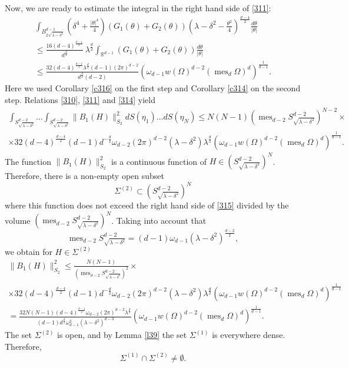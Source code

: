 \documentclass[a4paper,12pt]{article}
\numberwithin{equation}{section}
\def \de{\delta}
\def \la{\lambda}
\def \te{\theta}
\def \oo{\omega}
\def \O{\Omega}
\def \R{\mathbb{R}}
\def\mes{\operatorname{mes}}
\newcommand{\<}{\langle}
\renewcommand{\>}{\rangle}
\theoremstyle{plain}
\theoremstyle{definition}
\theoremstyle{remark}
\renewcommand{\le}{\leqslant}
\begin{document}
Now, we are ready to estimate the integral in the right hand side of \eqref{311}:
\begin{eqnarray}
\nonumber
\int_{B_{2\sqrt{\la-\de^2}}^{d-1}} \left(\de^4 + \frac{|\te|^4}4\right)
\left(G_1(\te) + G_2(\te)\right) \left(\la - \de^2 - \frac{\te^2}4\right)^{\frac{d-4}2} \frac{d\te}{|\te|} \\
\label{314}
\le \frac{16 (d-4)^{\frac{d-4}2}}{d^{\frac{d}2}}\, \la^{\frac{d}2}
\int_{\R^{d-1}} \left(G_1(\te) + G_2(\te)\right) \frac{d\te}{|\te|} \\
\le \frac{32 (d-4)^{\frac{d-4}2} \la^{\frac{d}2} (d-1) (2\pi)^{d-2}}{d^{\frac{d}2} (d-2)}
\left(\oo_{d-1} w(\O)^{d-2} \left(\mes_d\O\right)^d\right)^{\frac1{d-1}}.
\nonumber
\end{eqnarray}
Here we used Corollary \ref{c316} on the first step and Corollary \ref{c314} on the second step.
Relations \eqref{310}, \eqref{311} and \eqref{314} yield 
\begin{eqnarray}
\nonumber
\int_{S_{\sqrt{\la-\de^2}}^{d-2}} \dots \int_{S_{\sqrt{\la-\de^2}}^{d-2}} 
\|B_1 (H)\|_{S_2}^2 dS (\eta_1) \dots dS (\eta_N) 
\le N (N-1) \left(\mes_{d-2} S_{\sqrt{\la-\de^2}}^{d-2}\right)^{N-2} \times \\
\times 32 (d-4)^{\frac{d-4}2} (d-1) d^{-\frac{d}2} \oo_{d-2} (2\pi)^{d-2} (\la-\de^2) \la^{\frac{d}2}
\left(\oo_{d-1} w(\O)^{d-2} \left(\mes_d\O\right)^d\right)^{\frac1{d-1}}.
\label{315}
\end{eqnarray}
The function $\|B_1 (H)\|_{S_2}^2$ is a continuous function of 
$H \in \left(S_{\sqrt{\la-\de^2}}^{d-2}\right)^N$.
Therefore, there is a non-empty open subset 
$$
\Sigma^{(2)} \subset \left(S_{\sqrt{\la-\de^2}}^{d-2}\right)^N
$$
where this function does not exceed the right hand side of \eqref{315}
divided by the volume $\left(\mes_{d-2} S_{\sqrt{\la-\de^2}}^{d-2}\right)^N$.
Taking into account that
$$
\mes_{d-2} S_{\sqrt{\la-\de^2}}^{d-2}
= (d-1) \oo_{d-1} (\la-\de^2)^{\frac{d-2}2},
$$
we obtain for $H \in \Sigma^{(2)}$
\begin{eqnarray}
\nonumber
\|B_1 (H)\|_{S_2}^2 
\le \frac{N (N-1)}{\left(\mes_{d-2} S_{\sqrt{\la-\de^2}}^{d-2}\right)^2} \times \\
\label{317}
\times 32 (d-4)^{\frac{d-4}2} (d-1) d^{-\frac{d}2} \oo_{d-2} (2\pi)^{d-2} (\la-\de^2) \la^{\frac{d}2}
\left(\oo_{d-1} w(\O)^{d-2} \left(\mes_d\O\right)^d\right)^{\frac1{d-1}} \\
= \frac{32 N (N-1) (d-4)^{\frac{d-4}2} \oo_{d-2} (2\pi)^{d-2} \la^{\frac{d}2}}
{(d-1) d^{\frac{d}2} \oo_{d-1}^2 (\la-\de^2)^{d-3}}  
\left(\oo_{d-1} w(\O)^{d-2} \left(\mes_d\O\right)^d\right)^{\frac1{d-1}} .
\nonumber
\end{eqnarray}
The set $\Sigma^{(2)}$ is open, and by Lemma \ref{l39} 
the set $\Sigma^{(1)}$ is everywhere dense.
Therefore, 
$$
\Sigma^{(1)} \cap \Sigma^{(2)} \neq \emptyset.
$$
\end{document}
